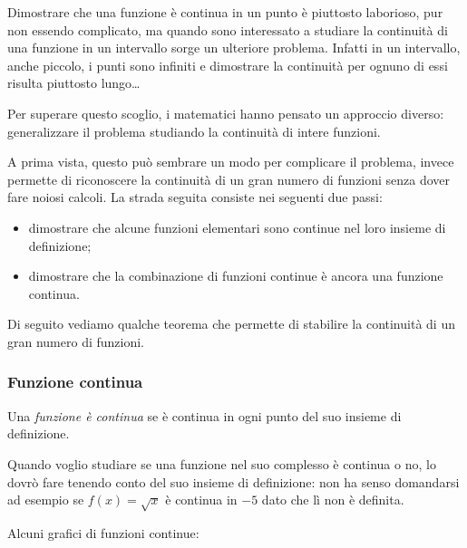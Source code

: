 Dimostrare che una funzione è continua in un punto è piuttosto laborioso, 
pur non essendo complicato, ma quando sono interessato a studiare la 
continuità di una funzione in un intervallo sorge un ulteriore problema. 
Infatti in un intervallo, anche piccolo, i punti sono infiniti e dimostrare 
la continuità per ognuno di essi risulta piuttosto lungo\dots

Per superare questo scoglio, i matematici hanno pensato un approccio 
diverso:
generalizzare il problema studiando la continuità di intere funzioni.

A prima vista, questo può sembrare un modo per complicare il problema, 
invece permette di riconoscere la continuità di un gran numero di 
funzioni senza dover fare noiosi calcoli. La strada seguita consiste nei 
seguenti due passi:
\begin{itemize} [noitemsep]
\item dimostrare che alcune funzioni elementari sono continue nel loro 
insieme di definizione;
\item dimostrare che la combinazione di funzioni continue è ancora una 
funzione continua.
\end{itemize}
Di seguito vediamo qualche teorema che permette di stabilire la continuità di 
un gran numero di funzioni.

\subsubsection{Funzione continua}
\label{subsubsec:cont_funzionecontinua}

\begin{definizione}
Una \emph{funzione è continua} se è continua in ogni punto del suo 
insieme di definizione.
\end{definizione}

Quando voglio studiare se una funzione nel suo complesso è continua o no, lo 
dovrò fare tenendo conto del suo insieme di definizione: non ha senso 
domandarsi ad esempio se \(f(x) = \sqrt{x}\) è continua in \(-5\) dato che lì 
non è definita.

Alcuni grafici di funzioni continue:

\hspace{-12mm}\begin{minipage}{.32\textwidth}
\begin{center} \scalebox{.9}{\contsecondoa} \end{center}
\end{minipage}
\hfill
\begin{minipage}{.32\textwidth}
\begin{center} \contrad \end{center}
\end{minipage}
\hfill
\begin{minipage}{.32\textwidth}
\begin{center} \contip \end{center}
\end{minipage}


